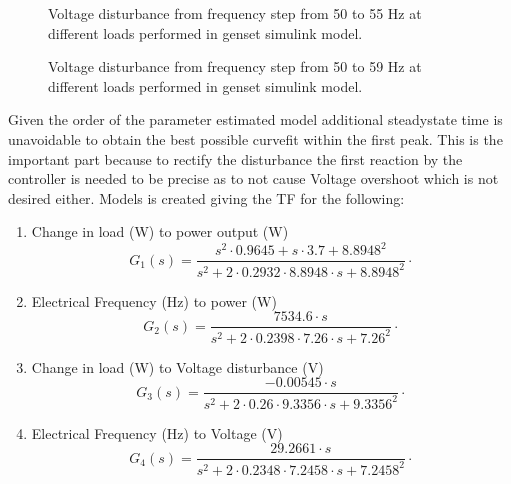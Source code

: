 \begin{figure}[H]
\centering

\caption{Voltage disturbance from frequency step from 50 to 55 Hz at different loads performed in genset simulink model.}
\label{fig:freq5055_103050kwmodel_volt}
\end{figure}

\begin{figure}[H]
\centering

\caption{Voltage disturbance from frequency step from 50 to 59 Hz at different loads performed in genset simulink model.}
\label{fig:freq5059_103050kwmodel_volt}
\end{figure}

Given the order of the parameter estimated model additional steadystate time is unavoidable to obtain the best possible curvefit within the first peak. This is the important part because to rectify the disturbance the first reaction by the controller is needed to be precise as to not cause Voltage overshoot which is not desired either.
Models is created giving the TF for the following:         

\begin{enumerate}
	\item Change in load (W) to power output (W)
	\begin{equation}
	G_1(s) = \frac {s^2 \cdot 0.9645+s \cdot 3.7+8.8948^2}{s^2+2\cdot 0.2932 \cdot 8.8948 \cdot s + 8.8948^2} \unit{\cdot}
	\end{equation} 
	\item Electrical Frequency (Hz) to power (W)
	\begin{equation}
	G_2(s) = \frac {7534.6 \cdot s}{s^2+2\cdot 0.2398 \cdot 7.26 \cdot s + 7.26^2} \unit{\cdot}
	\end{equation}
	\item Change in load (W) to Voltage disturbance (V)
	\begin{equation}
	G_3(s) = \frac {-0.00545 \cdot s}{s^2+2\cdot 0.26 \cdot 9.3356 \cdot s + 9.3356^2} \unit{\cdot}
	\end{equation} 
	\item Electrical Frequency (Hz) to Voltage (V)
	\begin{equation}
	G_4(s) = \frac {29.2661 \cdot s}{s^2+2\cdot 0.2348 \cdot 7.2458 \cdot s + 7.2458^2} \unit{\cdot}
\end{equation} 
\end{enumerate}

